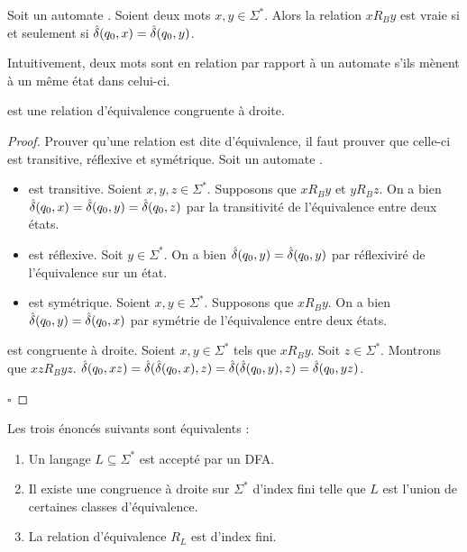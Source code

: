 	\begin{definition}[Relation \rb]
		Soit un automate \automaton. Soient deux mots $x,y\in\Sigma^*$. Alors la relation $xR_By$ est vraie si et seulement si $\hat{\delta}(q_0,x)=\hat{\delta}(q_0,y)$.
	\end{definition}

	Intuitivement, deux mots sont en relation \rb par rapport à un automate s'ils mènent à un même état dans celui-ci.

	\begin{lemma}
		\rb est une relation d'équivalence congruente à droite.
	\end{lemma}

	\begin{proof}
		Prouver qu'une relation est dite d'équivalence, il faut prouver que celle-ci est transitive, réflexive et symétrique.
		Soit un automate \automaton.
		\begin{itemize}
		\item \rb est transitive. Soient $x,y,z\in\Sigma^*$. Supposons que $xR_By$ et $yR_Bz$. On a bien $\hat{\delta}(q_0,x)=\hat{\delta}(q_0,y)=\hat{\delta}(q_0,z)$ par la transitivité de l'équivalence entre deux états.
		\item \rb est réflexive. Soit $y\in\Sigma^*$. On a bien $\hat{\delta}(q_0,y)=\hat{\delta}(q_0,y)$ par réflexiviré de l'équivalence sur un état.
		\item \rb est symétrique. Soient $x,y\in\Sigma^*$. Supposons que $xR_By$. On a bien $\hat{\delta}(q_0,y)=\hat{\delta}(q_0,x)$ par symétrie de l'équivalence entre deux états.
		\end{itemize}

		\rb est congruente à droite. Soient $x,y\in\Sigma^*$ tels que $xR_By$. Soit $z\in\Sigma^*$. Montrons que $xzR_Byz$. $\hat{\delta}(q_0,xz)=\hat{\delta}(\hat{\delta}(q_0,x),z)=\hat{\delta}(\hat{\delta}(q_0,y),z)=\hat{\delta}(q_0,yz)$.

		\hfill$\square$
	\end{proof}

	\begin{theorem}
		Les trois énoncés suivants sont équivalents :
		\begin{enumerate}
			\item Un langage $L\subseteq\Sigma^*$ est accepté par un DFA.
			\item Il existe une congruence à droite sur $\Sigma^*$ d'index fini telle que $L$ est l'union de certaines classes d'équivalence.
			\item La relation d'équivalence $R_L$ est d'index fini.
		\end{enumerate}
	\end{theorem}


